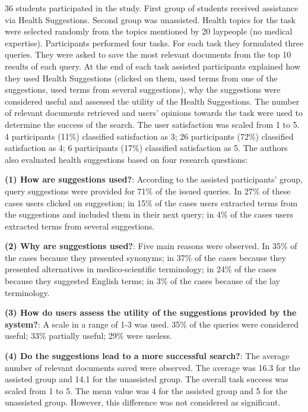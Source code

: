\documentclass[]{article}
\begin{document}
36 students participated in the study. First group of students received assistance via Health Suggestions. Second group was unassisted. Health topics for the task were selected randomly from the topics mentioned by 20 laypeople (no medical expertise). Participants performed four tasks. For each task they formulated three queries. They were asked to save the most relevant documents from the top 10 results of each query. At the end of each task assisted participants explained how they used Health Suggestions (clicked on them, used terms from one of the suggestions, used terms from several suggestions), why the suggestions were considered useful and assessed the utility of the Health Suggestions. The number of relevant documents retrieved and users' opinions towards the task were used to determine the success of the search. The user satisfaction was scaled from 1 to 5. 4 participants (11\%) classified satisfaction as 3; 26 participants (72\%) classified satisfaction as 4; 6 participants (17\%) classified satisfaction as 5. The authors also evaluated health suggestions based on four research questions:

\textbf{(1) How are suggestions used?}: According to the assisted participants' group, query suggestions were provided for 71\% of the issued queries. In 27\% of these cases users clicked on suggestion; in 15\% of the cases users extracted terms from the suggestions and included them in their next query; in 4\% of the cases users extracted terms from several suggestions.           

\textbf{(2) Why are suggestions used?}: Five main reasons were observed. In 35\% of the cases because they presented synonyms; in 37\% of the cases because they presented alternatives in medico-scientific terminology; in 24\% of the cases because they suggested English terms; in 3\% of the cases because of the lay terminology. 

\textbf{(3) How do users assess the utility of the suggestions provided by the system?}: A scale in a range of 1-3 was used. 35\% of the queries were considered useful; 33\% partially useful; 29\% were useless.   

\textbf{(4) Do the suggestions lead to a more successful search?}: The average number of relevant documents saved were observed. The average was 16.3 for the assisted group and 14.1 for the unassisted group. The overall task success was scaled from 1 to 5. The mean value was 4 for the assisted group and 5 for the unassisted group. However, this difference was not considered as significant.   
\end{document}
